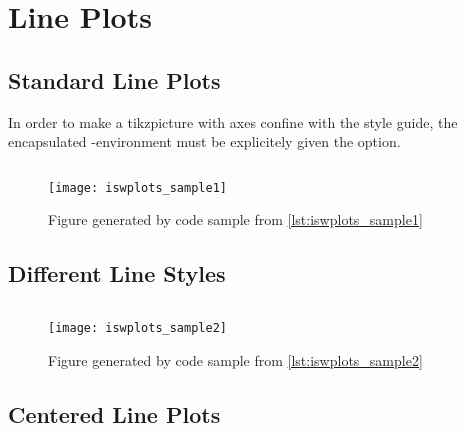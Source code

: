 \documentclass{scrartcl}
\begin{document}



\section{Line Plots}


\subsection{Standard Line Plots}

In order to make a tikzpicture with axes confine with the style guide, the encapsulated -environment must be explicitely given the  option.

\begin{listing}[H]
  \inputminted{latex}{iswplots_sample1.tikz}
  \caption{Code sample for the figure shown in \cref{fig:iswplots_sample1}}
  \label{lst:iswplots_sample1}
\end{listing}

\begin{figure}[H]
  \centering
  \smaller
  \texttt{[image: iswplots\_sample1]}
  \caption{%
    Figure generated by code sample from \cref{lst:iswplots_sample1}
  }
  \label{fig:iswplots_sample1}
\end{figure}


\subsection{Different Line Styles}



\begin{listing}[H]
  \inputminted{latex}{iswplots_sample2.tikz}
  \caption{Code sample for the figure shown in \cref{fig:iswplots_sample2}}
  \label{lst:iswplots_sample2}
\end{listing}

\begin{figure}[H]
  \centering
  \smaller
  \texttt{[image: iswplots\_sample2]}
  \caption{%
    Figure generated by code sample from \cref{lst:iswplots_sample2}
  }
  \label{fig:iswplots_sample2}
\end{figure}


\subsection{Centered Line Plots}
\end{document}
